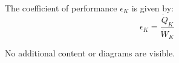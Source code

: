 The coefficient of performance \( \epsilon_K \) is given by:  
\[
\epsilon_K = \frac{\dot{Q}_K}{\dot{W}_K}
\]

No additional content or diagrams are visible.